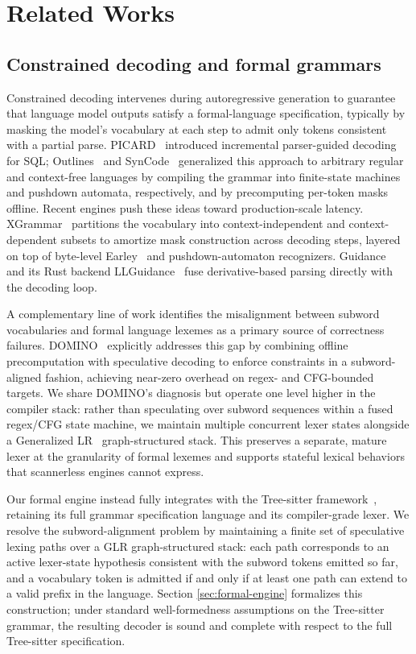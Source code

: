\documentclass[11pt]{article}
\theoremstyle{plain}
\theoremstyle{definition}
\begin{document}
\section{Related Works}
\label{sec:related}

\subsection{Constrained decoding and formal grammars}

Constrained decoding intervenes during autoregressive generation to guarantee
that language model outputs satisfy a formal-language specification, typically
by masking the model's vocabulary at each step to admit only tokens consistent
with a partial parse. PICARD~\cite{picard} introduced incremental parser-guided
decoding for SQL; Outlines~\cite{outlines} and SynCode~\cite{syncode}
generalized this approach to arbitrary regular and context-free languages by
compiling the grammar into finite-state machines and pushdown automata,
respectively, and by precomputing per-token masks offline. Recent engines push
these ideas toward production-scale latency. XGrammar~\cite{xgrammar,
xgrammar-2} partitions the vocabulary into context-independent and
context-dependent subsets to amortize mask construction across decoding steps,
layered on top of byte-level Earley~\cite{earley-1970} and pushdown-automaton
recognizers. Guidance~\cite{guidance} and its Rust backend
LLGuidance~\cite{llguidance} fuse derivative-based parsing directly with the
decoding loop.

A complementary line of work identifies the misalignment between subword
vocabularies and formal language lexemes as a primary source of correctness
failures. DOMINO~\cite{domino-2024} explicitly addresses this gap by combining
offline precomputation with speculative decoding to enforce constraints in a
subword-aligned fashion, achieving near-zero overhead on regex- and CFG-bounded
targets. We share DOMINO's diagnosis but operate one level higher in the
compiler stack: rather than speculating over subword sequences within a fused
regex/CFG state machine, we maintain multiple concurrent lexer states alongside
a Generalized LR~\cite{tomita-1987} graph-structured stack. This preserves a
separate, mature lexer at the granularity of formal lexemes and supports
stateful lexical behaviors that scannerless engines cannot express.

Our formal engine instead fully integrates with the Tree-sitter
framework~\cite{tree-sitter-2026}, retaining its full grammar specification
language and its compiler-grade lexer. We resolve the subword-alignment problem
by maintaining a finite set of speculative lexing paths over a GLR
graph-structured stack: each path corresponds to an active lexer-state
hypothesis consistent with the subword tokens emitted so far, and a vocabulary
token is admitted if and only if at least one path can extend to a valid prefix
in the language. Section \ref{sec:formal-engine} formalizes this construction;
under standard well-formedness assumptions on the Tree-sitter grammar, the
resulting decoder is sound and complete with respect to the full Tree-sitter
specification.
\end{document}
